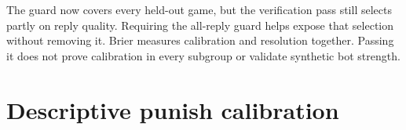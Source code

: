 \documentclass{article}
\begin{document}
The guard now covers every held-out game, but the verification pass still
selects partly on reply quality. Requiring the all-reply guard helps expose
that selection without removing it. Brier measures calibration and
resolution together. Passing it does not prove calibration in every
subgroup or validate synthetic bot strength.

\appendix
\section{Descriptive punish calibration}
\small
\CalibrationTables
\end{document}
